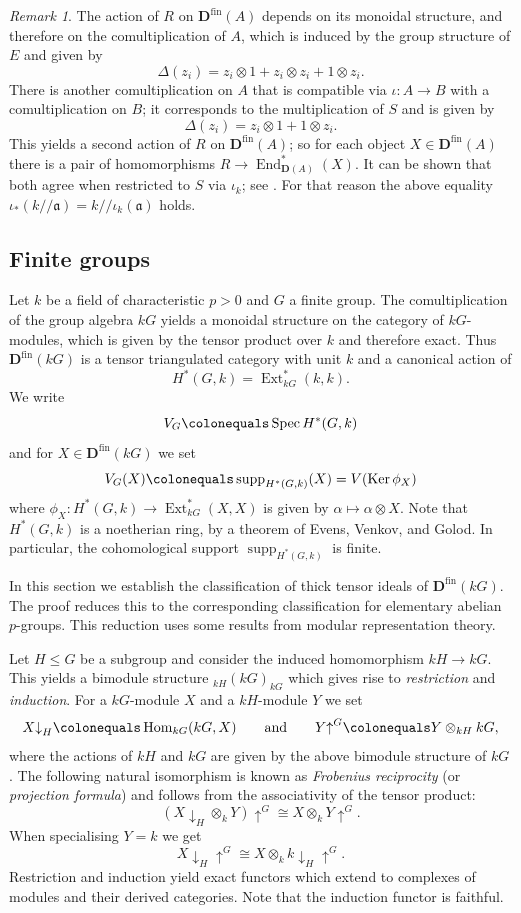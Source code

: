 \documentclass{amsart}[a4]
\theoremstyle{definition}
\theoremstyle{remark}
\newtheorem{remark}[theorem]{Remark}
\numberwithin{equation}{section}
\newcommand{\End}{\operatorname{End}}
\newcommand{\Ext}{\operatorname{Ext}}
\newcommand{\Hom}{\operatorname{Hom}}
\newcommand{\Ker}{\operatorname{Ker}}
\newcommand{\Spec}{\operatorname{Spec}}
\newcommand{\supp}{\operatorname{supp}}
\newcommand{\da}{{\downarrow}}
\newcommand{\kos}[2]{{#1}/\!\!/{#2}}
\newcommand{\ua}{{\uparrow}}
\newcommand{\fin}{\mathrm{fin}}
\newcommand{\bfD}{\mathbf D}
\newcommand{\fa}{\mathfrak{a}}
\let\Delta\varDelta
\begin{document}
\begin{remark}\label{re:iota-koszul}
  The action of $R$ on $\bfD^\fin(A)$ depends on its monoidal
  structure, and therefore on the comultiplication of $A$, which is
  induced by the group structure of $E$ and given by
\[\Delta(z_i)=z_i\otimes 1 +z_i\otimes z_i + 1\otimes z_i.\]
  There is another
  comultiplication on $A$ that is compatible via
  $\iota\colon A\to B$ with a comultiplication on $B$; it
  corresponds to the multiplication of $S$ and is given by
\[\Delta(z_i)=z_i\otimes 1 + 1\otimes z_i.\] This yields a second
  action of $R$ on $\bfD^\fin(A)$; so for each object
  $X\in \bfD^\fin(A)$ there is a pair of homomorphisms
  $R\to\End^*_{\bfD(A)}(X)$. It can be shown that both agree when
  restricted to $S$ via $\iota_k$; see
  \cite[Theorem~4.4]{Carlson/Iyengar:2017a}. For that reason the above
  equality $\iota_*(\kos{k}{\fa})=\kos{k}{\iota_k(\fa)}$ holds.
\end{remark}



\subsection*{Finite groups}

Let $k$ be a field of characteristic $p>0$ and $G$ a finite group. The
comultiplication of the group algebra $kG$ yields a monoidal structure
on the category of $kG$-modules, which is given by the tensor product
over $k$ and therefore exact. Thus $\bfD^\fin(kG)$ is a
tensor triangulated category with unit $k$ and a canonical action
of \[H^*(G,k)=\Ext_{kG}^*(k,k).\] We write
\[V_G\colonequals\Spec H^*(G,k)\]
and for $X\in\bfD^\fin(kG)$ we set
\[V_G(X)\colonequals\supp_{H^*(G,k)}(X)=V(\Ker\phi_X)\]
where $\phi_X\colon H^*(G,k)\to\Ext^*_{kG}(X,X)$ is given by $\alpha\mapsto\alpha\otimes X$.
Note that $H^*(G,k)$ is a noetherian ring, by a theorem of Evens, Venkov, and
Golod. In particular, the cohomological support $\supp_{H^*(G,k)}$ is finite.

In this section we establish the classification of thick tensor ideals
of  $\bfD^\fin(kG)$. The proof reduces this to the corresponding
classification for elementary abelian $p$-groups. This reduction uses
some results from modular representation theory. 

Let $H\le G$ be a subgroup and consider the induced homomorphism
$kH\to kG$. This yields a bimodule structure $_{kH}(kG)_{kG}$
which gives rise to \emph{restriction} and \emph{induction}. For a
$kG$-module $X$ and a $kH$-module $Y$ we set
\[X\da_H\colonequals\Hom_{kG}(kG,X) \qquad\text{and}\qquad
  Y\ua^G\colonequals Y\otimes_{kH}kG,\]
where the actions of $kH$ and $kG$ are given by the above bimodule
structure of $kG$.
The following natural
isomorphism is known as \emph{Frobenius reciprocity} (or
\emph{projection formula}) and follows from the associativity of the
tensor product:
\[(X\da_H\otimes_k Y)\ua^G\cong X\otimes_k Y\ua^G.\]
When specialising $Y=k$ we get
\[X\da_H\ua^G\cong  X\otimes_k k\da_H\ua^G.\]
Restriction and
induction yield exact functors which extend to complexes of modules
and their derived categories. Note that the induction functor is faithful.
\end{document}
